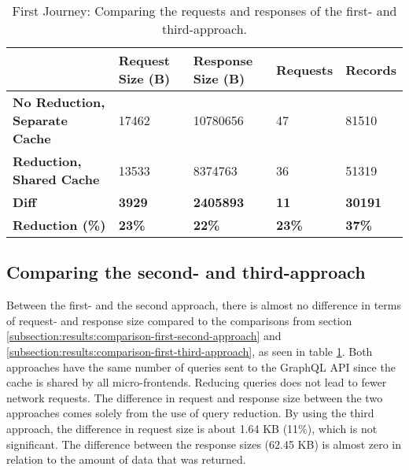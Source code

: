 \ifshowTables
\begin{table}[H]
  \begin{tabular}{|l|l|l|l|l|}
  \hline
  & \textbf{Request Size (B)} & \textbf{Response Size (B)} & \textbf{Requests} & \textbf{Records}  \\
  \hline
  \textbf{No Reduction, Separate Cache} & 17462 & 10780656 & 47 & 81510 \\
  \hline
  \textbf{Reduction, Shared Cache} & 13533 & 8374763 & 36 & 51319 \\
  \hline
  \hline
  \textbf{Diff} & \textbf{3929} & \textbf{2405893} & \textbf{11} & \textbf{30191} \\
  \hline
  \textbf{Reduction (\%)} & \textbf{23\%} & \textbf{22\%} & \textbf{23\%} & \textbf{37\%} \\
  \hline
  \end{tabular}
  \caption{First Journey: Comparing the requests and responses of the first- and third-approach.}\label{table:results:size-comparison-first-path-no-cache-no-reduction-cache-reduction}
\end{table}
\fi

\subsection{Comparing the second- and third-approach}\label{subsection:results:comparison-second-third-approach}

Between the first- and the second approach, there is almost no difference in terms of request- and response size compared to the comparisons from section \ref{subsection:results:comparison-first-second-approach} and \ref{subsection:results:comparison-first-third-approach}, as seen in table \ref{table:results:size-comparison-first-path-no-cache-no-reduction-cache-reduction}. Both approaches have the same number of queries sent to the GraphQL \ac{API} since the cache is shared by all micro-frontends. Reducing queries does not lead to fewer network requests. The difference in request and response size between the two approaches comes solely from the use of query reduction. By using the third approach, the difference in request size is about 1.64 KB (11\%), which is not significant. The difference between the response sizes (62.45 KB) is almost zero in relation to the amount of data that was returned.

